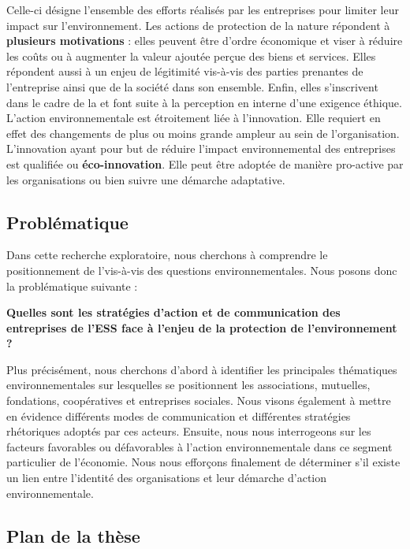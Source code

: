 Celle-ci désigne l'ensemble des efforts réalisés par les entreprises pour limiter leur impact sur l'environnement. Les actions de protection de la nature répondent à \textbf{plusieurs motivations} : elles peuvent être d'ordre économique et viser à réduire les coûts ou à augmenter la valeur ajoutée perçue des biens et services. Elles répondent aussi à un enjeu de légitimité vis-à-vis des parties prenantes de l'entreprise ainsi que de la société dans son ensemble. Enfin, elles s'inscrivent  dans le cadre de la \rse et font suite à la perception en interne d'une exigence éthique. L'action environnementale est étroitement liée à l'innovation. Elle requiert en effet des changements de plus ou moins grande ampleur au sein de l'organisation. L'innovation ayant pour but de réduire l'impact environnemental des entreprises est qualifiée   ou \textbf{éco-innovation}. Elle peut être adoptée de manière pro-active par les organisations ou bien suivre une démarche adaptative.


\subsection*{Problématique}

Dans cette recherche exploratoire, nous cherchons à comprendre le positionnement de l’\ess vis-à-vis des questions environnementales. Nous posons donc la problématique suivante : \\

\begin{tcolorbox}
  \textbf{Quelles sont les stratégies d’action et de communication des entreprises de l’ESS face à l'enjeu de la protection de l'environnement ?}
\end{tcolorbox}

Plus précisément, nous cherchons d'abord à identifier les principales thématiques environnementales sur lesquelles se positionnent les associations, mutuelles, fondations, coopératives et entreprises sociales. Nous visons également à mettre en évidence différents modes de communication et différentes stratégies rhétoriques adoptés par ces acteurs. Ensuite, nous nous interrogeons sur les facteurs favorables ou défavorables à l’action environnementale dans ce segment particulier de l’économie. Nous nous efforçons finalement de déterminer s'il existe un lien entre l'identité des organisations et leur démarche d'action environnementale.

\subsection*{Plan de la thèse}

